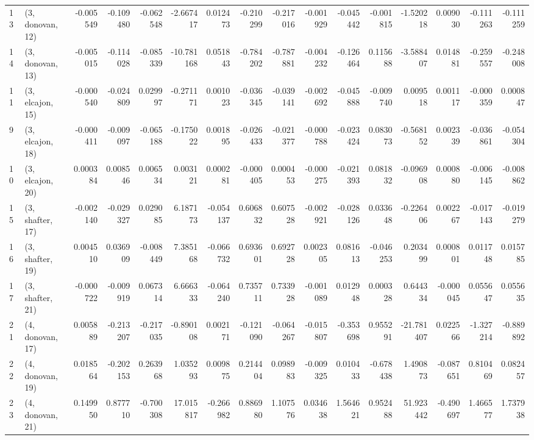 \begin{tabular}{llrrrrrrrrrrrrrr}
13 &  (3, donovan, 12) &  -0.005549 & -0.109480 & -0.062548 &  -2.667417 &  0.012473 &  -0.210299 & -0.217016 & -0.001929 & -0.045442 & -0.001815 &  -1.520218 &  0.009030 & -0.111263 & -0.111259 \\
14 &  (3, donovan, 13) &  -0.005015 & -0.114028 & -0.085339 & -10.781168 &  0.051843 &  -0.784202 & -0.787881 & -0.004232 & -0.126464 &  0.115688 &  -3.588407 &  0.014881 & -0.259557 & -0.248008 \\
11 &  (3, elcajon, 15) &  -0.000540 & -0.024809 &  0.029997 &  -0.271171 &  0.001023 &  -0.036345 & -0.039141 & -0.002692 & -0.045888 & -0.009740 &   0.009518 &  0.001117 & -0.000359 &  0.000847 \\
9  &  (3, elcajon, 18) &  -0.000411 & -0.009097 & -0.065188 &  -0.175022 &  0.001895 &  -0.026433 & -0.021377 & -0.000788 & -0.023424 &  0.083073 &  -0.568152 &  0.002339 & -0.036861 & -0.054304 \\
10 &  (3, elcajon, 20) &   0.000384 &  0.008546 &  0.006534 &   0.003121 &  0.000281 &  -0.000405 &  0.000453 & -0.000275 & -0.021393 &  0.081832 &  -0.096908 &  0.000880 & -0.006145 & -0.008862 \\
15 &  (3, shafter, 17) &  -0.002140 & -0.029327 &  0.029085 &   6.187173 & -0.054137 &   0.606832 &  0.607528 & -0.002921 & -0.028126 &  0.033648 &  -0.226406 &  0.002267 & -0.017143 & -0.019279 \\
16 &  (3, shafter, 19) &   0.004510 &  0.036909 & -0.008449 &   7.385168 & -0.066732 &   0.693601 &  0.692728 &  0.002305 &  0.081613 & -0.046253 &   0.203499 &  0.000801 &  0.011748 &  0.015785 \\
17 &  (3, shafter, 21) &  -0.000722 & -0.009919 &  0.067314 &   6.666333 & -0.064240 &   0.735711 &  0.733928 & -0.001089 &  0.012948 &  0.000328 &   0.644334 & -0.000045 &  0.055647 &  0.055635 \\
21 &  (4, donovan, 17) &   0.005889 & -0.213207 & -0.217035 &  -0.890108 &  0.002171 &  -0.121090 & -0.064267 & -0.015807 & -0.353698 &  0.955291 & -21.781407 &  0.022566 & -1.327214 & -0.889892 \\
22 &  (4, donovan, 19) &   0.018564 & -0.202153 &  0.263968 &   1.035293 &  0.009875 &   0.214404 &  0.098983 & -0.009325 &  0.010433 & -0.678438 &   1.490873 & -0.087651 &  0.810469 &  0.082457 \\
23 &  (4, donovan, 21) &   0.149950 &  0.877710 & -0.700308 &  17.015817 & -0.266982 &   0.886980 &  1.107576 &  0.034638 &  1.564621 &  0.952488 &  51.923442 & -0.490697 &  1.466577 &  1.737938 \\

\end{tabular}
